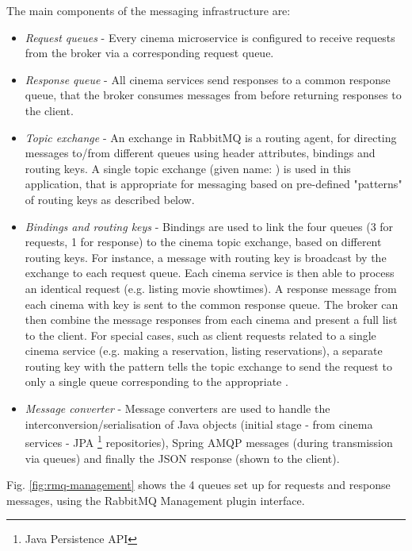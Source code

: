 The main components of the messaging infrastructure are:
\begin{itemize}
  \item \textit{Request queues} - Every cinema microservice is configured to receive requests from the broker via a corresponding request queue.
  \item \textit{Response queue} - All cinema services send responses to a common response queue, that the broker consumes messages from before returning responses to the client.
  \item \textit{Topic exchange} - An exchange in RabbitMQ is a routing agent, for directing messages to/from different queues using header attributes, bindings and routing keys. A single topic exchange (given name: ) is used in this application, that is appropriate for messaging based on pre-defined "patterns" of routing keys as described below.
  \item \textit{Bindings and routing keys} - Bindings are used to link the four queues (3 for requests, 1 for response) to the cinema topic exchange, based on different routing keys. For instance, a message with routing key  is broadcast by the exchange to each request queue. Each cinema service is then able to process an identical request (e.g. listing movie showtimes). A response message from each cinema with key  is sent to the common response queue. The broker can then combine the message responses from each cinema and present a full list to the client. For special cases, such as client requests related to a single cinema service (e.g. making a reservation, listing reservations), a separate routing key with the pattern  tells the topic exchange to send the request to only a single queue corresponding to the appropriate .
  \item \textit{Message converter} - Message converters are used to handle the interconversion/serialisation of Java objects (initial stage - from cinema services - JPA \footnote{Java Persistence API} repositories), Spring AMQP messages (during transmission via queues) and finally the JSON response (shown to the client).
\end{itemize}

Fig. \ref{fig:rmq-management} shows the 4 queues set up for requests and response messages, using the RabbitMQ Management plugin interface.

